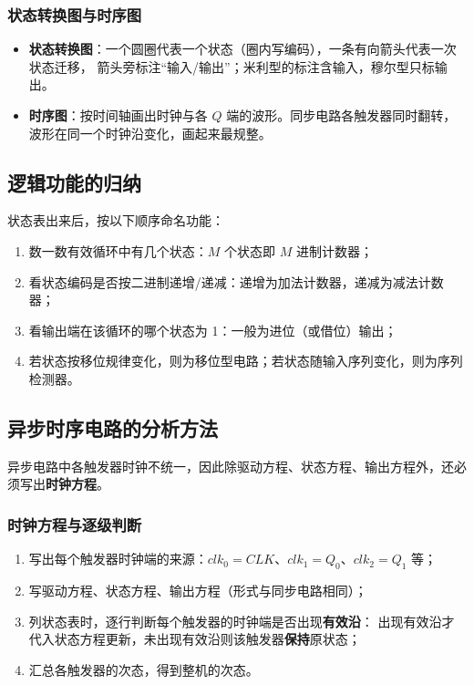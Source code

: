 \subsubsection{状态转换图与时序图}
\begin{itemize}
    \item \textbf{状态转换图}：一个圆圈代表一个状态（圈内写编码），一条有向箭头代表一次状态迁移，
    箭头旁标注“输入/输出”；米利型的标注含输入，穆尔型只标输出。
    \item \textbf{时序图}：按时间轴画出时钟与各 $Q$ 端的波形。同步电路各触发器同时翻转，波形在同一个时钟沿变化，画起来最规整。
\end{itemize}

\subsection{逻辑功能的归纳}
状态表出来后，按以下顺序命名功能：
\begin{enumerate}
    \item 数一数有效循环中有几个状态：$M$ 个状态即 $M$ 进制计数器；
    \item 看状态编码是否按二进制递增/递减：递增为加法计数器，递减为减法计数器；
    \item 看输出端在该循环的哪个状态为 1：一般为进位（或借位）输出；
    \item 若状态按移位规律变化，则为移位型电路；若状态随输入序列变化，则为序列检测器。
\end{enumerate}

\subsection{异步时序电路的分析方法}
异步电路中各触发器时钟不统一，因此除驱动方程、状态方程、输出方程外，还必须写出\textbf{时钟方程}。

\subsubsection{时钟方程与逐级判断}
\begin{enumerate}
    \item 写出每个触发器时钟端的来源：$clk_0=CLK$、$clk_1=Q_0$、$clk_2=Q_1$ 等；
    \item 写驱动方程、状态方程、输出方程（形式与同步电路相同）；
    \item 列状态表时，逐行判断每个触发器的时钟端是否出现\textbf{有效沿}：
    出现有效沿才代入状态方程更新，未出现有效沿则该触发器\textbf{保持}原状态；
    \item 汇总各触发器的次态，得到整机的次态。
\end{enumerate}

